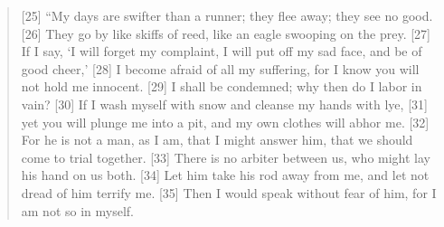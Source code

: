 \begin{quote}
    [25] “My days are swifter than a runner;
        they flee away; they see no good.
    [26] They go by like skiffs of reed,
        like an eagle swooping on the prey.
    [27] If I say, ‘I will forget my complaint,
        I will put off my sad face, and be of good cheer,’
    [28] I become afraid of all my suffering,
        for I know you will not hold me innocent.
    [29] I shall be condemned;
        why then do I labor in vain?
    [30] If I wash myself with snow
        and cleanse my hands with lye,
    [31] yet you will plunge me into a pit,
        and my own clothes will abhor me.
    [32] For he is not a man, as I am, that I might answer him,
        that we should come to trial together.
    [33] There is no arbiter between us,
        who might lay his hand on us both.
    [34] Let him take his rod away from me,
        and let not dread of him terrify me.
    [35] Then I would speak without fear of him,
        for I am not so in myself.

  \end{quote}
